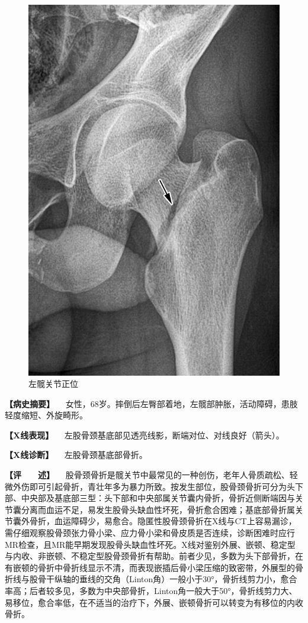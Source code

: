 \begin{figure}[!htbp]
 \centering
 \includegraphics{./images/Image00043.jpg}
 \captionsetup{justification=centering}
 \caption{左髋关节正位}
 \label{fig2-3-16}
  \end{figure} 

\textbf{【病史摘要】}
　女性，68岁。摔倒后左臀部着地，左髋部肿胀，活动障碍，患肢轻度缩短、外旋畸形。

\textbf{【X线表现】}
　左股骨颈基底部见透亮线影，断端对位、对线良好（箭头）。

\textbf{【X线诊断】} 　左股骨颈基底部骨折。

\textbf{【评　　述】}
　股骨颈骨折是髋关节中最常见的一种创伤，老年人骨质疏松、轻微外伤即可引起骨折，青壮年多为暴力所致。按发生部位，股骨颈骨折可分为头下部、中央部及基底部三型：头下部和中央部属关节囊内骨折，骨折近侧断端因与关节囊分离而血运不足，易发生股骨头缺血性坏死，骨折愈合困难；基底部骨折属关节囊外骨折，血运障碍少，易愈合。隐匿性股骨颈骨折在X线与CT上容易漏诊，需仔细观察股骨颈张力骨小梁、应力骨小梁和骨皮质是否连续，诊断困难时应行MR检查，且MR能早期发现股骨头缺血性坏死。X线对鉴别外展、嵌顿、稳定型与内收、非嵌顿、不稳定型股骨颈骨折有帮助。前者少见，多数为头下部骨折，在有嵌顿的骨折中骨折线显示不清，而表现嵌插后骨小梁压缩的致密带，外展型的骨折线与股骨干纵轴的垂线的交角（Linton角）一般小于30°，骨折线剪力小，愈合率高；后者较多见，多数为中央部骨折，Linton角一般大于50°，骨折线剪力大、易移位，愈合率低，在不适当的治疗下，外展、嵌顿骨折可以转变为有移位的内收骨折。

